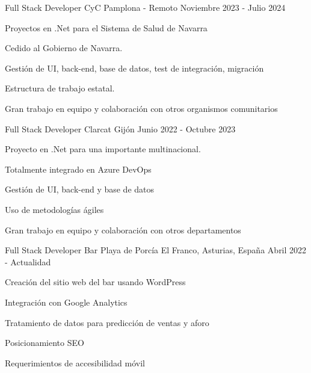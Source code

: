 

\begin{cventries}
    \cventry
    {Full Stack Developer} %
    {CyC} %
    {Pamplona - Remoto} %
    {Noviembre 2023 - Julio 2024} %
    {
        \begin{cvitems} %
            \item {Proyectos en .Net para el Sistema de Salud de Navarra}
            \item {Cedido al Gobierno de Navarra.}
            \item {Gestión de UI, back-end, base de datos, test de integración, migración}
            \item {Estructura de trabajo estatal.}
            \item {Gran trabajo en equipo y colaboración con otros organismos comunitarios}
        \end{cvitems}
    }
    \cventry
    {Full Stack Developer} %
    {Clarcat} %
    {Gijón} %
    {Junio 2022 - Octubre 2023} %
    {
        \begin{cvitems} %
            \item {Proyecto en .Net para una importante multinacional.}
            \item {Totalmente integrado en Azure DevOps}
            \item {Gestión de UI, back-end y base de datos}
            \item {Uso de metodologías ágiles}
            \item {Gran trabajo en equipo y colaboración con otros departamentos}
        \end{cvitems}
    }
    \cventry
    {Full Stack Developer} %
    {Bar Playa de Porcía} %
    {El Franco, Asturias, España} %
    {Abril 2022 - Actualidad} %
    {
        \begin{cvitems} %
            \item {Creación del sitio web del bar usando WordPress}
            \item {Integración con Google Analytics}
            \item {Tratamiento de datos para predicción de ventas y aforo}
            \item {Posicionamiento SEO}
            \item {Requerimientos de accesibilidad móvil}
        \end{cvitems}
    }


\end{cventries}

